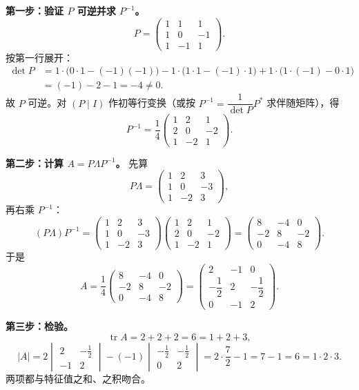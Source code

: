 \textbf{第一步：验证 \(P\) 可逆并求 \(P^{-1}\)。}
\[
P=\begin{pmatrix}1&1&1\\1&0&-1\\1&-1&1\end{pmatrix}.
\]
按第一行展开：
\[
\begin{aligned}
\det P&=1\cdot\bigl(0\cdot1-(-1)(-1)\bigr)-1\cdot\bigl(1\cdot1-(-1)\cdot1\bigr)+1\cdot\bigl(1\cdot(-1)-0\cdot1\bigr)\\
&=(-1)-2-1=-4\neq0.
\end{aligned}
\]
故 \(P\) 可逆。对 \((P\mid I)\) 作初等行变换（或按 \(P^{-1}=\dfrac{1}{\det P}P^{*}\) 求伴随矩阵），得
\[
P^{-1}=\frac14\begin{pmatrix}1&2&1\\2&0&-2\\1&-2&1\end{pmatrix}.
\]

\textbf{第二步：计算 \(A=P\Lambda P^{-1}\)。} 先算
\[
P\Lambda=
\begin{pmatrix}1&2&3\\1&0&-3\\1&-2&3\end{pmatrix},
\]
再右乘 \(P^{-1}\)：
\[
(P\Lambda)P^{-1}=
\begin{pmatrix}1&2&3\\1&0&-3\\1&-2&3\end{pmatrix}
\begin{pmatrix}1&2&1\\2&0&-2\\1&-2&1\end{pmatrix}
=\begin{pmatrix}8&-4&0\\-2&8&-2\\0&-4&8\end{pmatrix}.
\]
于是
\[
A=\frac14
\begin{pmatrix}8&-4&0\\-2&8&-2\\0&-4&8\end{pmatrix}
=\begin{pmatrix}
2&-1&0\\[2pt]
-\dfrac12&2&-\dfrac12\\[2pt]
0&-1&2
\end{pmatrix}.
\]

\textbf{第三步：检验。}
\[
\operatorname{tr}A=2+2+2=6=1+2+3,
\]
\[
|A|=2\begin{vmatrix}2&-\frac12\\-1&2\end{vmatrix}-(-1)\begin{vmatrix}-\frac12&-\frac12\\0&2\end{vmatrix}
=2\cdot\frac72-1=7-1=6=1\cdot2\cdot3.
\]
两项都与特征值之和、之积吻合。

